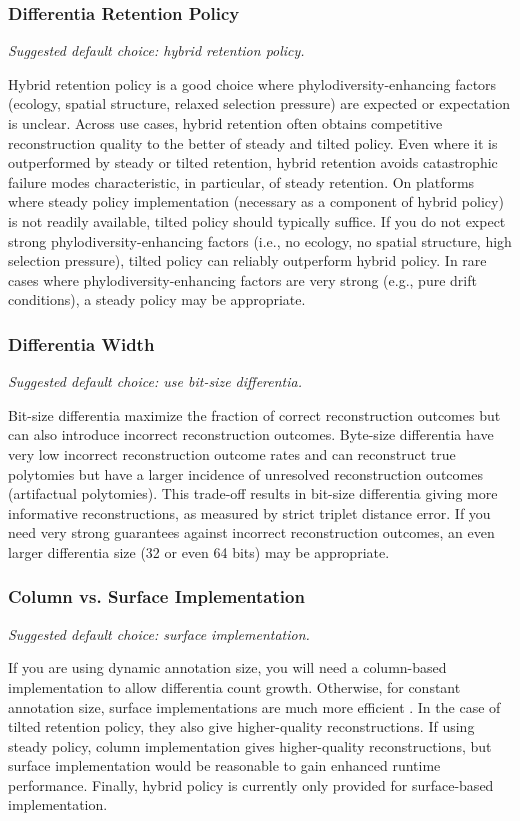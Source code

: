 \subsubsection{Differentia Retention Policy}
\textit{Suggested default choice: hybrid retention policy.}

Hybrid retention policy is a good choice where phylodiversity-enhancing factors (ecology, spatial structure, relaxed selection pressure) are expected or expectation is unclear.
Across use cases, hybrid retention often obtains competitive reconstruction quality to the better of steady and tilted policy.
Even where it is outperformed by steady or tilted retention, hybrid retention avoids catastrophic failure modes characteristic, in particular, of steady retention.
On platforms where steady policy implementation (necessary as a component of hybrid policy) is not readily available, tilted policy should typically suffice.
If you do not expect strong phylodiversity-enhancing factors (i.e., no ecology, no spatial structure, high selection pressure), tilted policy can reliably outperform hybrid policy.
In rare cases where phylodiversity-enhancing factors are very strong (e.g., pure drift conditions), a steady policy may be appropriate.

\subsubsection{Differentia Width}
\textit{Suggested default choice: use bit-size differentia.}

Bit-size differentia maximize the fraction of correct reconstruction outcomes but can also introduce incorrect reconstruction outcomes.
Byte-size differentia have very low incorrect reconstruction outcome rates and can reconstruct true polytomies but have a larger incidence of unresolved reconstruction outcomes (artifactual polytomies).
This trade-off results in bit-size differentia giving more informative reconstructions, as measured by strict triplet distance error.
If you need very strong guarantees against incorrect reconstruction outcomes, an even larger differentia size (32 or even 64 bits) may be appropriate.

\subsubsection{Column vs. Surface Implementation}
\textit{Suggested default choice: surface implementation.}

If you are using dynamic annotation size, you will need a column-based implementation to allow differentia count growth.
Otherwise, for constant annotation size, surface implementations are much more efficient \citep{moreno2024trackable}.
In the case of tilted retention policy, they also give higher-quality reconstructions.
If using steady policy, column implementation gives higher-quality reconstructions, but surface implementation would be reasonable to gain enhanced runtime performance.
Finally, hybrid policy is currently only provided for surface-based implementation.

